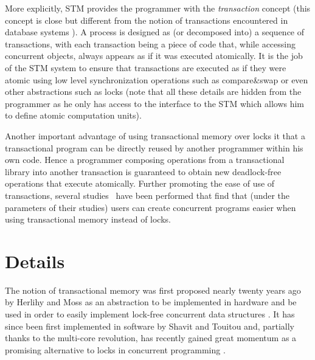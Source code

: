 More explicitly,  STM  
 provides the 
programmer  with the {\it transaction} concept (this concept 
is close but different from the notion of transactions encountered in 
database systems \cite{FFGH08,HCUAGSV07,HL08}).
 A process is designed as 
(or decomposed into)  a sequence of transactions, with each transaction 
being a piece  of code that, while  accessing  concurrent  objects, 
always  appears as if it was  executed atomically.
It  is the job of the 
STM system to ensure that transactions are executed as if they were atomic using low level synchronization
operations such as compare\&swap or even other abstractions such as locks
(note that all these details are hidden from the programmer as he only has access to the interface
to the STM which allows him to define atomic computation units).

Another important advantage of using transactional memory over locks it that a transactional program
can be directly reused by another programmer within his own code.
Hence a programmer composing operations from a transactional library into another 
transaction is guaranteed to obtain new deadlock-free operations that execute atomically.
Further promoting the ease of use of transactions, several studies~\cite{PA11,RHW10}
have been performed that find that (under the parameters of their studies) users can create concurrent programs
easier when using transactional memory instead of locks.




\section{Details}
\label{sec:details}
The notion  of   transactional  memory  was
first   proposed  nearly twenty years ago by Herlihy  and Moss 
as an abstraction to be implemented in hardware and be used in order to easily 
implement lock-free concurrent  data structures  \cite{HM93}.  It  has  since  been 
first implemented in software  by Shavit  and  Touitou   \cite{ST97} and, partially thanks
to the multi-core revolution,  has
recently gained great  momentum as  a promising alternative  to locks in
concurrent programming  \cite{FFGH08,HCUAGSV07,LK08,R08}.


